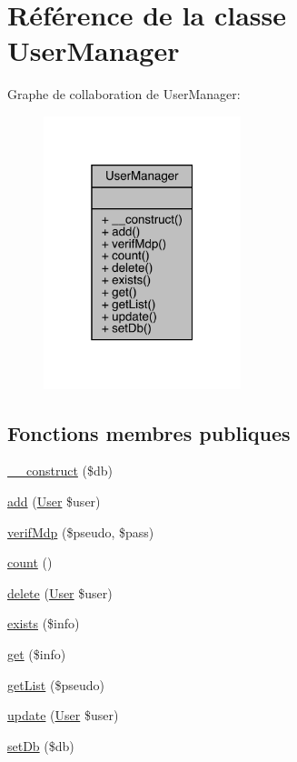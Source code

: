 \hypertarget{class_user_manager}{}\section{Référence de la classe User\+Manager}
\label{class_user_manager}


Graphe de collaboration de User\+Manager\+:\nopagebreak
\begin{figure}[H]
\begin{center}
\leavevmode
\includegraphics[width=163pt]{class_user_manager__coll__graph}
\end{center}
\end{figure}
\subsection*{Fonctions membres publiques}
\begin{DoxyCompactItemize}
\item 
\mbox{\hyperlink{class_user_manager_aa48eb712a3ee85eaa253e55e130efb52}{\+\_\+\+\_\+construct}} (\$db)
\item 
\mbox{\hyperlink{class_user_manager_a7fb17bfd67135d7be043d59aeec1dcd4}{add}} (\mbox{\hyperlink{class_user}{User}} \$user)
\item 
\mbox{\hyperlink{class_user_manager_acc70ee4bbcbfcf4b0cd7b6733a46128a}{verif\+Mdp}} (\$pseudo, \$pass)
\item 
\mbox{\hyperlink{class_user_manager_a15eb546aadcee7b28426bacf0df7f340}{count}} ()
\item 
\mbox{\hyperlink{class_user_manager_a2314547a8d8203652065e73e485a5af4}{delete}} (\mbox{\hyperlink{class_user}{User}} \$user)
\item 
\mbox{\hyperlink{class_user_manager_a5ab80d63eb955da9e0ab01a9b1607437}{exists}} (\$info)
\item 
\mbox{\hyperlink{class_user_manager_abbd033634c759ebe6a16a98e27697f31}{get}} (\$info)
\item 
\mbox{\hyperlink{class_user_manager_ae5ecbbf0eaf09bf9f8b05208a5e858f4}{get\+List}} (\$pseudo)
\item 
\mbox{\hyperlink{class_user_manager_ad953740cf56464fdb81b8bc9654c5371}{update}} (\mbox{\hyperlink{class_user}{User}} \$user)
\item 
\mbox{\hyperlink{class_user_manager_a08370d99527bfd6b2fae2923a7c21acb}{set\+Db}} (\$db)
\end{DoxyCompactItemize}


